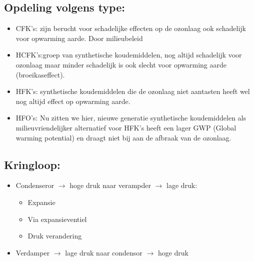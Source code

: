 \documentclass[12pt]{article}
\begin{document}
\subsection{Opdeling volgens type:}
\begin{itemize}
    \item CFK's: zijn berucht voor schadelijke effecten op de ozonlaag ook schadelijk voor opwarming aarde. Door milieubeleid
    \item HCFK's:groep van synthetische koudemiddelen, nog altijd schadelijk voor ozonlaag maar minder schadelijk is ook slecht voor opwarming aarde (broeikaseffect).
    \item HFK's: synthetische koudemiddelen die de ozonlaag niet aantasten heeft wel nog altijd effect op opwarming aarde.
    \item HFO's: Nu zitten we hier, nieuwe generatie synthetische koudemiddelen als milieuvriendelijker alternatief voor HFK's heeft een lager GWP (Global warming potential) en draagt niet bij aan de afbraak van de ozonlaag.
\end{itemize}
\subsection{Kringloop:}
\begin{itemize}
    \item Condenseror $\rightarrow$ hoge druk naar verampder $\rightarrow$ lage druk:\begin{itemize}
        \item Expansie 
        \item Via expansieventiel 
        \item Druk verandering
    \end{itemize}
    \item Verdamper $\rightarrow$ lage druk naar condensor $\rightarrow$ hoge druk
\end{itemize}
\end{document}
